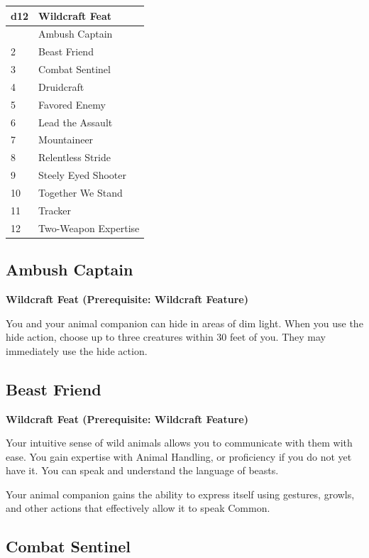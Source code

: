\documentclass[12pt,letterpaper,twocolumn,openany,nodeprecatedcode,bg=none]{dndbook}
\begin{document}
\begin{longtable}[]{@{}ll@{}}
\toprule\noalign{}
d12 & Wildcraft Feat \\
\midrule\noalign{}
\endhead
\bottomrule\noalign{}
\endlastfoot
1 & Ambush Captain \\
2 & Beast Friend \\
3 & Combat Sentinel \\
4 & Druidcraft \\
5 & Favored Enemy \\
6 & Lead the Assault \\
7 & Mountaineer \\
8 & Relentless Stride \\
9 & Steely Eyed Shooter \\
10 & Together We Stand \\
11 & Tracker \\
12 & Two-Weapon Expertise \\
\end{longtable}

\subsection{Ambush Captain}\label{ambush-captain}

\textbf{Wildcraft Feat (Prerequisite: Wildcraft Feature)}

You and your animal companion can hide in areas of dim light. When you
use the hide action, choose up to three creatures within 30 feet of you.
They may immediately use the hide action.

\subsection{Beast Friend}\label{beast-friend}

\textbf{Wildcraft Feat (Prerequisite: Wildcraft Feature)}

Your intuitive sense of wild animals allows you to communicate with them
with ease. You gain expertise with Animal Handling, or proficiency if
you do not yet have it. You can speak and understand the language of
beasts.

Your animal companion gains the ability to express itself using
gestures, growls, and other actions that effectively allow it to speak
Common.

\subsection{Combat Sentinel}\label{combat-sentinel}
\end{document}
